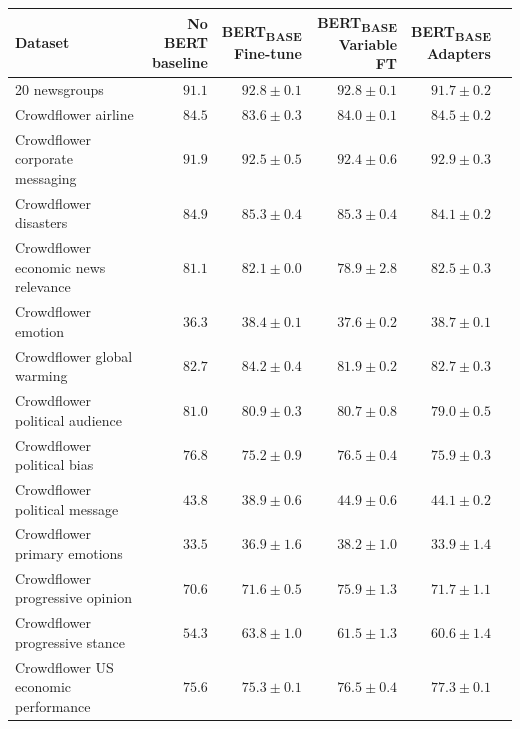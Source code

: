 \renewcommand{\arraystretch}{0.9}
\begin{table}[t]
\centering
\begin{adjustbox}{max width=\textwidth}
\begin{tabular}{l|rrrrr}
\toprule
Dataset &
\pbox{5cm}{No BERT\\baseline} &
\pbox{5cm}{BERT\textsubscript{BASE}\\Fine-tune} &
\pbox{5cm}{BERT\textsubscript{BASE}\\Variable FT} &
\pbox{5cm}{BERT\textsubscript{BASE}\\Adapters} \\
\midrule
20 newsgroups & $ 91.1 $ & $ 92.8 \pm 0.1 $ & $ 92.8 \pm 0.1 $ & $91.7 \pm 0.2$ \\
Crowdflower airline & $ 84.5 $ & $ 83.6 \pm 0.3 $ & $ 84.0 \pm 0.1 $ & $ 84.5 \pm 0.2 $ \\
Crowdflower corporate messaging & $ 91.9 $ & $ 92.5 \pm 0.5 $ & $ 92.4 \pm 0.6 $ & $ 92.9 \pm 0.3 $ \\
Crowdflower disasters & $ 84.9 $ & $ 85.3 \pm 0.4 $ & $ 85.3 \pm 0.4 $ & $ 84.1 \pm 0.2 $ \\
Crowdflower economic news relevance & $ 81.1 $ & $ 82.1 \pm 0.0 $ & $ 78.9 \pm 2.8 $ & $ 82.5 \pm 0.3 $ \\
Crowdflower emotion & $ 36.3 $ & $ 38.4 \pm 0.1 $ & $ 37.6 \pm 0.2 $ & $ 38.7 \pm 0.1 $ \\
Crowdflower global warming & $ 82.7 $ & $ 84.2 \pm 0.4
 $ & $ 81.9 \pm 0.2 $ & $ 82.7 \pm 0.3 $ \\
Crowdflower political audience & $ 81.0 $ & $ 80.9 \pm 0.3 $ & $ 80.7 \pm 0.8
 $ & $ 79.0 \pm 0.5 $ \\
Crowdflower political bias & $ 76.8 $ & $ 75.2 \pm 0.9 $ & $ 76.5 \pm 0.4 $ & $ 75.9 \pm 0.3 $ \\
Crowdflower political message & $ 43.8 $ & $ 38.9 \pm 0.6 $ & $ 44.9 \pm 0.6 $ & $ 44.1 \pm 0.2 $ \\
Crowdflower primary emotions & $ 33.5 $ & $ 36.9 \pm 1.6 $ & $ 38.2 \pm 1.0 $ & $ 33.9 \pm 1.4 $ \\
Crowdflower progressive opinion & $ 70.6 $ & $ 71.6 \pm 0.5 $ & $ 75.9 \pm 1.3 $ & $ 71.7 \pm 1.1 $ \\
Crowdflower progressive stance & $ 54.3 $ & $ 63.8 \pm 1.0 $ & $ 61.5 \pm 1.3 $ & $ 60.6 \pm 1.4 $ \\
Crowdflower US economic performance & $ 75.6 $ & $ 75.3 \pm 0.1 $ & $ 76.5 \pm 0.4 $ & $ 77.3 \pm 0.1 $ \\

\end{tabular}
\end{adjustbox}
\end{table}
